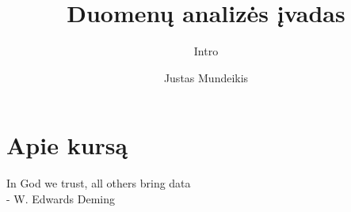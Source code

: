 \documentclass[11pt,xcolor=table]{beamer}
\author{Justas Mundeikis}
\title{Duomenų analizės įvadas}
\subtitle{Intro}
\begin{document}
\section{Apie kursą}

\begin{frame}
\titlepage
\end{frame}


\begin{frame}
\Large In God we trust, all others bring data\\ 
\scriptsize - W. Edwards Deming

\end{frame}

\end{document}
